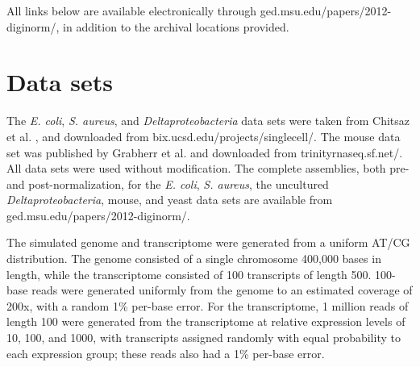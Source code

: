 \documentclass{pnastwo}
\begin{document}
\begin{article}
%


\begin{materials}

All links below are available electronically through
ged.msu.edu/papers/2012-diginorm/, in addition to the
archival locations provided.

\section{Data sets}

The {\em E. coli}, {\em S. aureus}, and {\em Deltaproteobacteria} data
sets were taken from Chitsaz et al. \cite{pubmed21926975}, and
downloaded from bix.ucsd.edu/projects/singlecell/.  The
mouse data set was published by Grabherr et al. \cite{pubmed21572440}
and downloaded from trinityrnaseq.sf.net/.  All data sets
were used without modification.
The complete assemblies, both pre- and post-normalization, for the
{\em E. coli}, {\em S. aureus}, the uncultured {\em
  Deltaproteobacteria}, mouse, and yeast data sets are available from
ged.msu.edu/papers/2012-diginorm/.

The simulated genome and transcriptome were generated from a uniform
AT/CG distribution.  The genome consisted of a single chromosome
400,000 bases in length, while the transcriptome consisted of 100
transcripts of length 500.  100-base reads were generated uniformly
from the genome to an estimated coverage of 200x, with a random 1\%
per-base error.  For the transcriptome, 1 million reads of length 100
were generated from the transcriptome at relative expression levels of
10, 100, and 1000, with transcripts assigned randomly with equal
probability to each expression group; these reads also had a 1\%
per-base error.


\end{materials}
\end{article}
\end{document}
